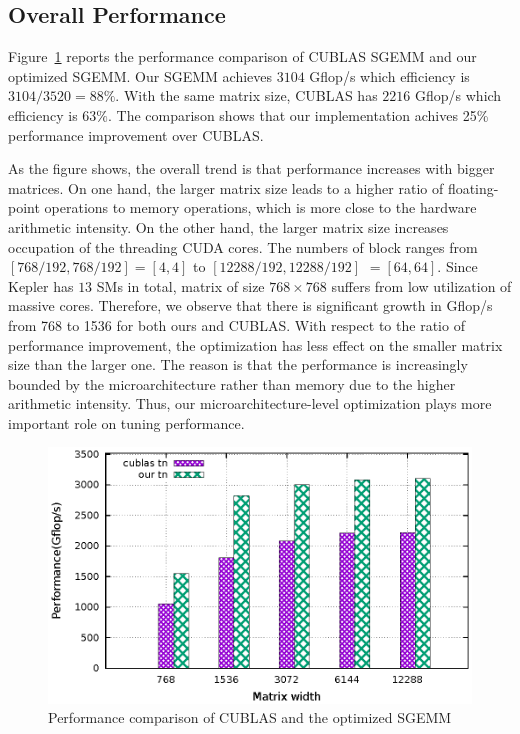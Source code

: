 \documentclass{sig-alternate-05-2015}
\begin{document}
\subsection{Overall Performance}
Figure~\ref{fig:sgemm_tn} reports the performance comparison of CUBLAS SGEMM and our optimized SGEMM.
Our SGEMM achieves $3104$ Gflop/s which efficiency is $3104/3520=88\%$. With the same matrix size, CUBLAS has $2216$ Gflop/s which efficiency is $63\%$. The comparison shows that our implementation achives 25\% performance improvement over CUBLAS.

As the figure shows, the overall trend is that performance increases with bigger matrices. On one hand, the larger matrix size leads to a higher ratio of floating-point operations to memory operations, which is more close to the hardware arithmetic intensity. On the other hand, the larger matrix size increases occupation of the threading CUDA cores. The numbers of block ranges from $[768/192,768/192]=[4,4]$ to $[12288/192, 12288/192]$ $=[64,64]$. Since Kepler has $13$ SMs in total, matrix of size $768\times 768$ suffers from low utilization of massive cores. Therefore, we observe that there is significant growth in Gflop/s from 768 to 1536 for both ours and CUBLAS. With respect to the ratio of performance improvement, the optimization has less effect on the smaller matrix size than the larger one. The reason is that the performance is increasingly bounded by the microarchitecture rather than memory due to the higher arithmetic intensity. Thus, our microarchitecture-level optimization plays more important role on tuning performance.

\begin{figure}[htbp]
\begin{center}
\includegraphics[scale=0.6]{sgemm_tn}
\caption{Performance comparison of CUBLAS and the optimized SGEMM }
\label{fig:sgemm_tn}
\end{center}
\end{figure}
\end{document}
